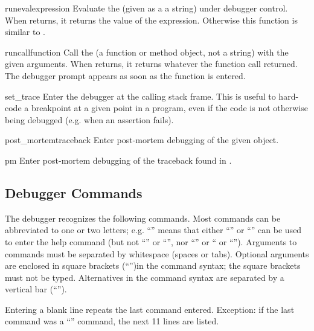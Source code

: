 \begin{funcdesc}{runeval}{expression}
Evaluate the  (given as a a string) under debugger
control.  When  returns, it returns the value of the
expression.  Otherwise this function is similar to
.
\end{funcdesc}

\begin{funcdesc}{runcall}{function}
Call the  (a function or method object, not a string)
with the given arguments.  When  returns, it returns
whatever the function call returned.  The debugger prompt appears as
soon as the function is entered.
\end{funcdesc}

\begin{funcdesc}{set_trace}{}
Enter the debugger at the calling stack frame.  This is useful to
hard-code a breakpoint at a given point in a program, even if the code
is not otherwise being debugged (e.g. when an assertion fails).
\end{funcdesc}

\begin{funcdesc}{post_mortem}{traceback}
Enter post-mortem debugging of the given  object.
\end{funcdesc}

\begin{funcdesc}{pm}{}
Enter post-mortem debugging of the traceback found in
.
\end{funcdesc}

\subsection{Debugger Commands}

The debugger recognizes the following commands.  Most commands can be
abbreviated to one or two letters; e.g. ``'' means that
either ``'' or ``'' can be used to enter the help
command (but not ``'' or ``'', nor ``'' or
`` or ``'').  Arguments to commands must be
separated by whitespace (spaces or tabs).  Optional arguments are
enclosed in square brackets (``\code{[]}'')in the command syntax; the
square brackets must not be typed.  Alternatives in the command syntax
are separated by a vertical bar (``\code{|}'').

Entering a blank line repeats the last command entered.  Exception: if
the last command was a ``'' command, the next 11 lines are
listed.

